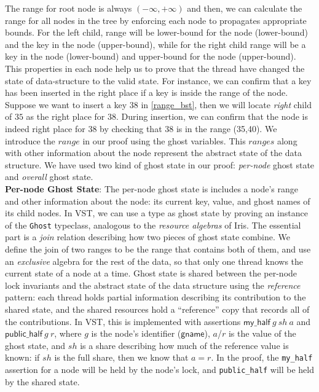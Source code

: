 \documentclass[acmsmall,screen]{acmart}\settopmatter{printfolios=true}
\newcommand{\gnamety}{\ensuremath{\mathsf{gname}}}
\begin{document}
The range for root node is always $(-\infty,+\infty)$ and then, we can calculate the range for all nodes in the tree by enforcing each node to propagates appropriate bounds. For the left child, range will be lower-bound for the node (lower-bound) and the key in the node (upper-bound), while for the right child range will be a key in the node (lower-bound) and upper-bound for the node (upper-bound). This properties in each node help us to prove that the thread have changed the state of data-structure to the valid state. For instance, we can confirm that a key has been inserted in the right place if a key is inside the range of the node. Suppose we want to insert a key $38$ in \ref{range_bst}, then we will locate \emph{right} child of $35$ as the right place for $38$. During insertion, we can confirm that the node is indeed right place for $38$ by checking that $38$ is in the range (35,40). We introduce the $range$ in our proof using the ghost variables. This $ranges$ along with other information about the node represent the abstract state of the data structure. We have used two kind of ghost state in our proof: \emph{per-node} ghost state and \emph{overall} ghost state.\\
\textbf{Per-node Ghost State}: The per-node ghost state is includes a node's range and other information about the node: its current key, value, and ghost names of its child nodes. In VST, we can use a type as ghost state by proving an instance of the \texttt{Ghost} typeclass, analogous to the \emph{resource algebras} of Iris. The essential part is a \emph{join} relation describing how two pieces of ghost state combine. We define the join of two ranges to be the range that contains both of them, and use an \emph{exclusive} algebra for the rest of the data, so that only one thread knows the current state of a node at a time. 
Ghost state is shared between the per-node lock invariants and the abstract state of the data structure using the \emph{reference} pattern: each thread holds partial information describing its contribution to the shared state, and the shared resources hold a ``reference'' copy that records all of the contributions. In VST, this is implemented with assertions $\mathsf{my\_half}\ g\ \mathit{sh}\ a$ and $\mathsf{public\_half}\ g\ r$, where $g$ is the node's identifier ($\gnamety$), $a$/$r$ is the value of the ghost state, and $\mathit{sh}$ is a share describing how much of the reference value is known: if $\mathit{sh}$ is the full share, then we know that $a = r$. In the proof, the \texttt{my\_half} assertion for a node will be held by the node's lock, and \texttt{public\_half} will be held by the shared state.
\end{document}
